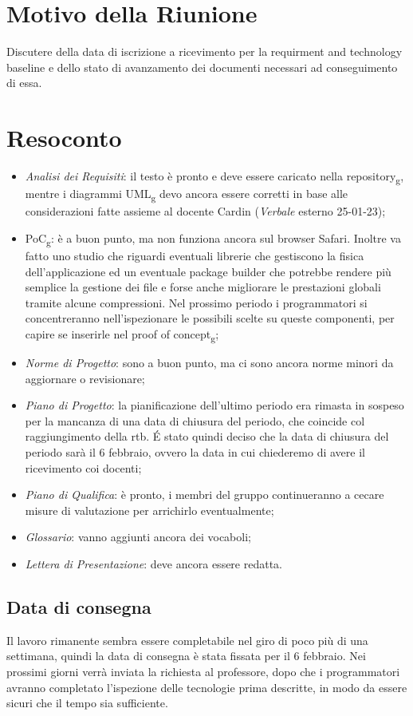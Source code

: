 \section{Motivo della Riunione}
Discutere della data di iscrizione a ricevimento per la requirment and technology baseline e dello stato di avanzamento dei documenti necessari ad conseguimento di essa.
\section{Resoconto}
\begin{itemize}
	\item \textit{Analisi dei Requisiti}: il testo è pronto e deve essere caricato nella repository\textsubscript{g}, mentre i diagrammi UML\textsubscript{g} devo ancora essere corretti in base alle considerazioni fatte assieme al docente Cardin (\textit{Verbale} esterno 25-01-23);
	
	\item PoC\textsubscript{g}: è a buon punto, ma non funziona ancora sul browser Safari. Inoltre va fatto uno studio che riguardi eventuali librerie che gestiscono la fisica dell'applicazione ed un eventuale package builder che potrebbe rendere più semplice la gestione dei file e forse anche migliorare le prestazioni globali tramite alcune compressioni. Nel prossimo periodo i programmatori si concentreranno nell'ispezionare le possibili scelte su queste componenti, per capire se inserirle nel proof of concept\textsubscript{g};
	
	\item \textit{Norme di Progetto}: sono a buon punto, ma ci sono ancora norme minori da aggiornare o revisionare;
	
	\item \textit{Piano di Progetto}: la pianificazione dell'ultimo periodo era rimasta in sospeso per la mancanza di una data di chiusura del periodo, che coincide col raggiungimento della rtb. É stato quindi deciso che la data di chiusura del periodo sarà il 6 febbraio, ovvero la data in cui chiederemo di avere il ricevimento coi docenti;
	
	\item \textit{Piano di Qualifica}: è pronto, i membri del gruppo continueranno a cecare misure di valutazione per arrichirlo eventualmente;
	
	\item \textit{Glossario}: vanno aggiunti ancora dei vocaboli;

	\item \textit{Lettera di Presentazione}: deve ancora essere redatta.
\end{itemize}

\subsection{Data di consegna}
Il lavoro rimanente sembra essere completabile nel giro di poco più di una settimana, quindi la data di consegna è stata fissata per il 6 febbraio. 
\newline Nei prossimi giorni verrà inviata la richiesta al professore, dopo che i programmatori avranno completato l'ispezione delle tecnologie prima descritte, in modo da essere sicuri che il tempo sia sufficiente.
